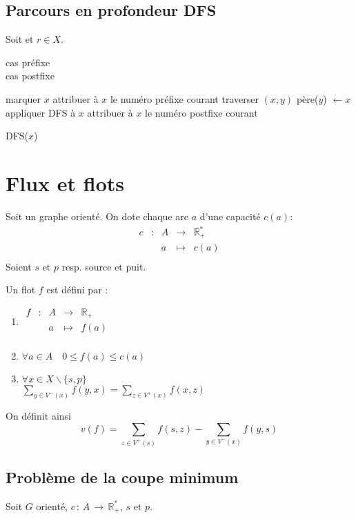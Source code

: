 \documentclass[a4paper, 8pt]{article}
\begin{document}
\begin{multicols*}{3}
\subsection*{Parcours en profondeur DFS}

Soit \GXA et $r\in X$.
\begin{flushright}
{\footnotesize
{\color{blue} cas préfixe} \\
{\color{red} cas postfixe}
}
\end{flushright}
\begin{algorithm}[H]
marquer $x$\;
{\color{blue} attribuer à $x$ le numéro préfixe courant}\;
{
	traverser $(x,y)$\;
	{
		père($y$) $\longleftarrow x$\;
		appliquer DFS à $x$\;
	}
}
{\color{red} attribuer à $x$ le numéro postfixe courant}\;
\caption{DFS($x$)}
\end{algorithm}

\section*{Flux et flots}

Soit \GXA un graphe orienté. On dote chaque arc $a$ d'une capacité $c(a)$:
\[
\begin{array}{cc|ccl}
c & : & A & \to & \mathbb{R}^*_+  \\
 & & a & \mapsto & c(a) \\
\end{array}
\]
Soient $s$ et $p$ resp. source et puit.

Un flot $f$ est défini par : \begin{enumerate}
\item $
\begin{array}{cc|ccl} 
f & : & A & \to & \mathbb{R}_+  \\
 & & a & \mapsto & f(a)\\
\end{array}
$
\item $\forall a \in A\quad 0 \leqslant f(a) \leqslant c(a) $
\item $ \forall x \in X\backslash\{s,p\}$\\ 
 $\displaystyle\sum_{y\in V^-(x)}{f(y,x)} = \sum_{z\in V^+(x)}{f(x,z)} $
\end{enumerate}

On définit ainsi
\[v(f) = \displaystyle\sum_{z\in V^+(s)}{f(s,z)} - \sum_{y\in V^-(x)}{f(y,s)} \]

\subsection*{Problème de la coupe minimum}
Soit $G$ orienté, $c\, :\, A\, \rightarrow\, \mathbb{R}^*_+$, $s$ et $p$.


\end{multicols*}
\end{document}
